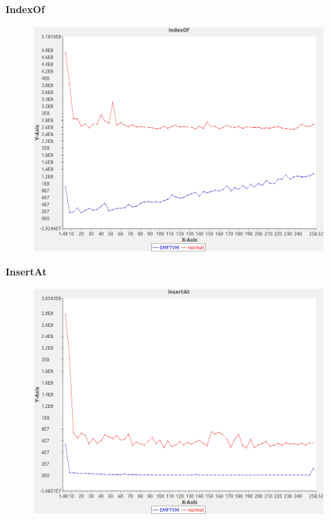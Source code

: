 \noindent\textbf{IndexOf}

\begin{figure}[h]
\centering
\includegraphics[width=\textwidth]{../graphs/orderedset/IndexOf}
\end{figure}
\pagebreak

\noindent\textbf{InsertAt}

\begin{figure}[h]
\centering
\includegraphics[width=\textwidth]{../graphs/orderedset/InsertAt}
\end{figure}
\pagebreak

